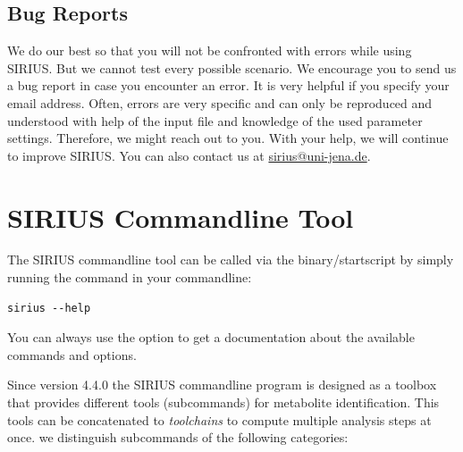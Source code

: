 \documentclass[letterpaper,10pt,openany,oneside]{sphinxmanual}
\newcommand{\todo}[1]{}
\begin{document}

\section{Bug Reports}

We do our best so that you will not be confronted with errors while using
SIRIUS.  But we cannot test every possible scenario.  We encourage you to
send us a bug report in case you encounter an error.  It is very helpful if
you specify your email address. Often, errors are very specific and can only
be reproduced and understood with help of the input file and knowledge of the
used parameter settings. Therefore, we might reach out to you. \todo{or add
an upload field?}  With your help, we will continue to improve SIRIUS.  You
can also contact us at \url{sirius@uni-jena.de}.




\chapter{SIRIUS Commandline Tool}
\label{commandline::doc}\label{commandline:sirius-commandline-tool}

\todo{what has changed in here? custom databases?}

The SIRIUS commandline tool can be called via the binary/startscript by simply running the command  in your commandline:

\begin{Verbatim}[commandchars=\\\{\}]
sirius --help
\end{Verbatim}

You can always use the  option to get a documentation about the available commands and options.

Since version 4.4.0 the SIRIUS commandline program is designed as a toolbox that 
provides different tools (subcommands) for metabolite identification. This tools can be concatenated to \emph{toolchains} to compute multiple analysis steps at once. we distinguish subcommands of the following categories:
\end{document}

